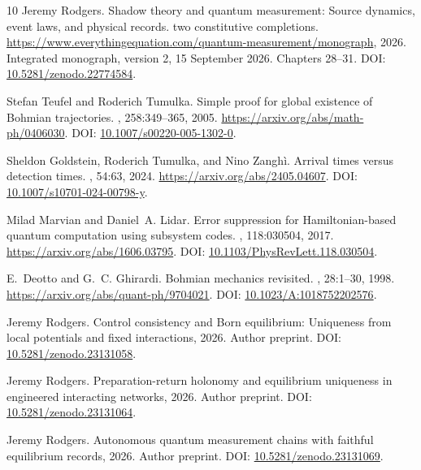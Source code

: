 \documentclass[11pt]{article}
\theoremstyle{definition}\newtheorem{assumption}[theorem]{Constitutive assumption}
\theoremstyle{remark}\newtheorem{remark}[theorem]{Remark}
\begin{document}
\begin{thebibliography}{10}
Jeremy Rodgers.
\newblock Shadow theory and quantum measurement: Source dynamics, event laws,
  and physical records. two constitutive completions.
\newblock
  \url{https://www.everythingequation.com/quantum-measurement/monograph}, 2026.
\newblock Integrated monograph, version 2, 15 September 2026. Chapters 28--31.
  DOI: \href{https://doi.org/10.5281/zenodo.22774584}{10.5281/zenodo.22774584}.

Stefan Teufel and Roderich Tumulka.
\newblock Simple proof for global existence of {Bohmian} trajectories.
, 258:349--365, 2005.
\newblock \url{https://arxiv.org/abs/math-ph/0406030}. DOI:
  \href{https://doi.org/10.1007/s00220-005-1302-0}{10.1007/s00220-005-1302-0}.

Sheldon Goldstein, Roderich Tumulka, and Nino Zangh{\`i}.
\newblock Arrival times versus detection times.
, 54:63, 2024.
\newblock \url{https://arxiv.org/abs/2405.04607}. DOI:
  \href{https://doi.org/10.1007/s10701-024-00798-y}{10.1007/s10701-024-00798-y}.

Milad Marvian and Daniel~A. Lidar.
\newblock Error suppression for {Hamiltonian}-based quantum computation using
  subsystem codes.
, 118:030504, 2017.
\newblock \url{https://arxiv.org/abs/1606.03795}. DOI:
  \href{https://doi.org/10.1103/PhysRevLett.118.030504}{10.1103/PhysRevLett.118.030504}.

E.~Deotto and G.~C. Ghirardi.
\newblock Bohmian mechanics revisited.
, 28:1--30, 1998.
\newblock \url{https://arxiv.org/abs/quant-ph/9704021}. DOI:
  \href{https://doi.org/10.1023/A:1018752202576}{10.1023/A:1018752202576}.

Jeremy Rodgers.
\newblock Control consistency and {Born} equilibrium: Uniqueness from local
  potentials and fixed interactions, 2026.
\newblock Author preprint. DOI: \href{https://doi.org/10.5281/zenodo.23131058}{10.5281/zenodo.23131058}.

Jeremy Rodgers.
\newblock Preparation-return holonomy and equilibrium uniqueness in engineered
  interacting networks, 2026.
\newblock Author preprint. DOI: \href{https://doi.org/10.5281/zenodo.23131064}{10.5281/zenodo.23131064}.

Jeremy Rodgers.
\newblock Autonomous quantum measurement chains with faithful equilibrium
  records, 2026.
\newblock Author preprint. DOI: \href{https://doi.org/10.5281/zenodo.23131069}{10.5281/zenodo.23131069}.


\end{thebibliography}
\end{document}
